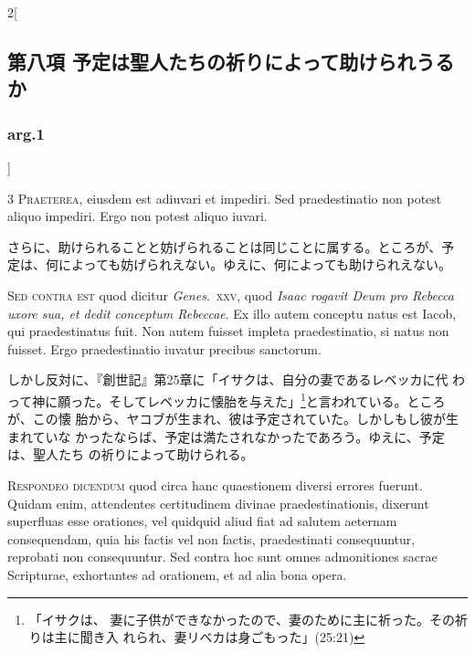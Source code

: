 \documentclass[paper=a4paper,fontsize=10pt,jafontsize=9pt,titlepage]{jlreq}
\begin{document}
\begin{paracol}{2}[\subsection{第八項 予定は聖人たちの祈りによって助けられうるか}\subsubsection{arg.1}]


{\scshape 3 Praeterea}, eiusdem est adiuvari et
impediri. Sed praedestinatio non potest aliquo impediri. Ergo non potest
aliquo iuvari.


\switchcolumn


さらに、助けられることと妨げられることは同じことに属する。ところが、予
定は、何によっても妨げられえない。ゆえに、何によっても助けられえない。


\switchcolumn*[\subsubsection{s.c.}]


{\scshape Sed contra est} quod dicitur {\itshape Genes}.~{\scshape xxv}, quod
{\itshape Isaac rogavit Deum pro Rebecca uxore sua, et dedit conceptum
Rebeccae}. Ex illo autem conceptu natus est Iacob, qui praedestinatus
fuit. Non autem fuisset impleta praedestinatio, si natus non
fuisset. Ergo praedestinatio iuvatur precibus sanctorum.


\switchcolumn


しかし反対に、『創世記』第25章に「イサクは、自分の妻であるレベッカに代
わって神に願った。そしてレベッカに懐胎を与えた」\footnote{「イサクは、
妻に子供ができなかったので、妻のために主に祈った。その祈りは主に聞き入
れられ、妻リベカは身ごもった」(25:21)}と言われている。ところが、この懐
胎から、ヤコブが生まれ、彼は予定されていた。しかしもし彼が生まれていな
かったならば、予定は満たされなかったであろう。ゆえに、予定は、聖人たち
の祈りによって助けられる。




{\scshape Respondeo dicendum} quod circa hanc quaestionem
diversi errores fuerunt. Quidam enim, attendentes certitudinem divinae
praedestinationis, dixerunt superfluas esse orationes, vel quidquid
aliud fiat ad salutem aeternam consequendam, quia his factis vel non
factis, praedestinati consequuntur, reprobati non consequuntur. Sed
contra hoc sunt omnes admonitiones sacrae Scripturae, exhortantes ad
orationem, et ad alia bona opera.


\switchcolumn



\end{paracol}
\end{document}
